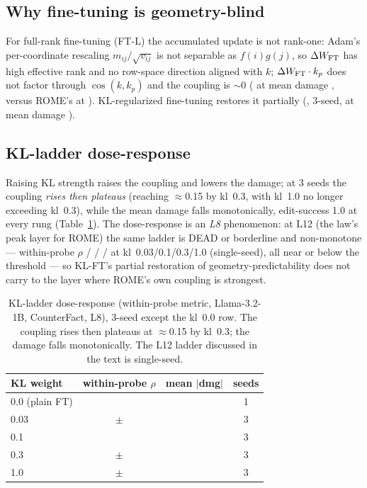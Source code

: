 \subsection{Why fine-tuning is geometry-blind}
For full-rank fine-tuning (FT-L) the accumulated update is not rank-one:
Adam's per-coordinate rescaling $m_{ij}/\sqrt{v_{ij}}$ is not separable as
$f(i)g(j)$, so $\Delta W_{\text{FT}}$ has high effective rank and no row-space
direction aligned with $k$; $\Delta W_{\text{FT}}\cdot k_p$ does not factor
through $\cos(k,k_p)$ and the coupling is $\sim$0 (\ftRho{} at mean damage
\ftDmg{}, versus ROME's \romeRhoSzero{} at \romeDmg{}). KL-regularized
fine-tuning restores it partially (\ftkatRho{}, 3-seed, at mean damage
\ftkatDmg{}).

\subsection{KL-ladder dose-response}
Raising KL strength raises the coupling and lowers the damage; at 3 seeds
the coupling \emph{rises then plateaus} (reaching $\approx$0.15 by
kl~0.3, with kl~1.0 no longer exceeding kl~0.3), while the mean damage falls
monotonically, edit-success 1.0 at every rung (Table~\ref{tab:klladder}).
The dose-response is an \emph{L8} phenomenon: at L12 (the law's peak layer
for ROME) the same ladder is DEAD or borderline and non-monotone ---
within-probe $\rho$ \klLtwelveZeroThree{} / \klLtwelveOne{} /
\klLtwelveThree{} / \klLtwelveFull{} at kl~0.03/0.1/0.3/1.0 (single-seed),
all near or below the \deadThresh{} threshold --- so KL-FT's partial
restoration of geometry-predictability does not carry to the layer where
ROME's own coupling is strongest.

\begin{table}[t]
\centering\small
\caption{KL-ladder dose-response (within-probe metric, Llama-3.2-1B,
CounterFact, L8), 3-seed except the kl~0.0 row. The coupling rises then
plateaus at $\approx$0.15 by kl~0.3; the damage falls monotonically. The
L12 ladder discussed in the text is single-seed.}
\label{tab:klladder}
\setlength{\tabcolsep}{4pt}
\begin{tabular}{@{}lccc@{}}
\toprule
KL weight & within-probe $\rho$ & mean $|$dmg$|$ & seeds \\
\midrule
0.0 (plain FT) & \klZeroRho{}  & \klZeroDmg{}  & 1 \\
0.03 & \klZeroThreeRho{}\,$\pm$\,\klZeroThreeRhoSD{} & \klZeroThreeDmg{} & 3 \\
0.1  & \klOneRho{}   & \klOneDmg{}  & 3 \\
0.3  & \klThreeRho{}\,$\pm$\,\klThreeRhoSD{} & \klThreeDmg{} & 3 \\
1.0  & \klFullRho{}\,$\pm$\,\klFullRhoSD{} & \klFullDmg{} & 3 \\
\bottomrule
\end{tabular}
\end{table}

